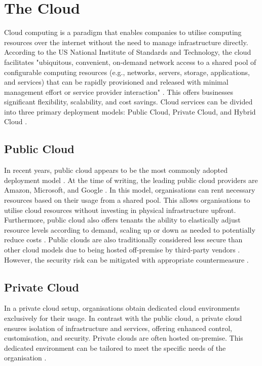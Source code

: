 \section{The Cloud}

Cloud computing is a paradigm that enables companies to utilise computing resources over the internet without the need to manage infrastructure directly. According to the US National Institute of Standards and Technology, the cloud facilitates "ubiquitous, convenient, on-demand network access to a shared pool of configurable computing resources (e.g., networks, servers, storage, applications, and services) that can be rapidly provisioned and released with minimal management effort or service provider interaction" \cite{editorCloudComputingGlossary}. This offers businesses significant flexibility, scalability, and cost savings. Cloud services can be divided into three primary deployment models: Public Cloud, Private Cloud, and Hybrid Cloud \cite{ramgovind2010management}.

\subsection{Public Cloud}

In recent years, public cloud appears to be the most commonly adopted deployment model \cite{VoiceKubernetesExperts,CNCFAnnualSurvey2024, opara2016critical}. At the time of writing, the leading public cloud providers are Amazon, Microsoft, and Google \cite{2024StateCloud}. In this model, organisations can rent necessary resources based on their usage from a shared pool. This allows organisations to utilise cloud resources without investing in physical infrastructure upfront. Furthermore, public cloud also offers tenants the ability to elastically adjust resource levels according to demand, scaling up or down as needed to potentially reduce costs \cite{suleiman2012understanding}. Public clouds are also traditionally considered less secure than other cloud models due to being hosted off-premise by third-party vendors \cite{sakr2011survey}. However, the security risk can be mitigated with appropriate countermeasure \cite{fox2009above}.


\subsection{Private Cloud}

In a private cloud setup, organisations obtain dedicated cloud environments exclusively for their usage. In contrast with the public cloud, a private cloud ensures isolation of infrastructure and services, offering enhanced control, customisation, and security. Private clouds are often hosted on-premise. This dedicated environment can be tailored to meet the specific needs of the organisation \cite{ramgovind2010management}.

